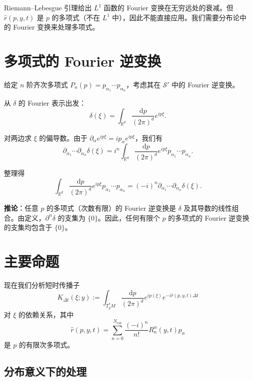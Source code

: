 \documentclass{book}
\newcommand{\assign}{:=}
\newcommand{\mathd}{\mathrm{d}}
\newcommand{\mathpi}{\pi}
\begin{document}
Riemann--Lebesgue 引理给出 $L^1$ 函数的 Fourier 变换在无穷远处的衰减。但 $\hat{r}(p,y,t)$ 是 $p$ 的多项式（不在 $L^1$ 中），因此不能直接应用。我们需要分布论中的 Fourier 变换来处理多项式。

\section{多项式的 Fourier 逆变换}

给定 $n$ 阶齐次多项式 $P_n(p) = p_{\alpha_1} \cdots p_{\alpha_n}$，考虑其在 $\mathcal{S}'$ 中的 Fourier 逆变换。

从 $\delta$ 的 Fourier 表示出发：
\begin{equation}
  \delta(\xi) = \int_{\mathbb{R}^d} \frac{\mathd p}{(2\mathpi)^d} e^{i p \xi}. \label{eq:delta-fourier}
\end{equation}

对两边求 $\xi$ 的偏导数。由于 $\partial_{\alpha} e^{i p \xi} = i p_\alpha e^{i p \xi}$，我们有
\[
\partial_{\alpha_1} \cdots \partial_{\alpha_n} \delta(\xi) = i^n \int_{\mathbb{R}^d} \frac{\mathd p}{(2\mathpi)^d} e^{i p \xi} p_{\alpha_1} \cdots p_{\alpha_n}.
\]

整理得
\begin{equation}
  \int_{\mathbb{R}^d} \frac{\mathd p}{(2\mathpi)^d} e^{i p \xi} p_{\alpha_1} \cdots p_{\alpha_n} = (-i)^n \partial_{\alpha_1} \cdots \partial_{\alpha_n} \delta(\xi). \label{eq:poly-fourier}
\end{equation}

{\bfseries 推论}：任意 $p$ 的多项式（次数有限）的 Fourier 逆变换是 $\delta$ 及其导数的线性组合。由定义，$\partial^\alpha \delta$ 的支集为 $\{0\}$。因此，任何有限个 $p$ 的多项式的 Fourier 逆变换的支集均包含于 $\{0\}$。

\section{主要命题}

现在我们分析短时传播子
\[
K_{\Delta t}(\xi; y) \assign \int_{T_y^*M} \frac{\mathd p}{(2\mathpi)^d} e^{i p(\xi)} e^{-i \hat{r}(p, y, t) \Delta t}
\]
对 $\xi$ 的依赖关系，其中
\[
\hat{r}(p, y, t) = \sum_{n=0}^{N_{\mathrm{cut}}} \frac{(-i)^n}{n!} R_n^\alpha(y, t) p_\alpha
\]
是 $p$ 的有限次多项式。

\subsection{分布意义下的处理}
\end{document}
